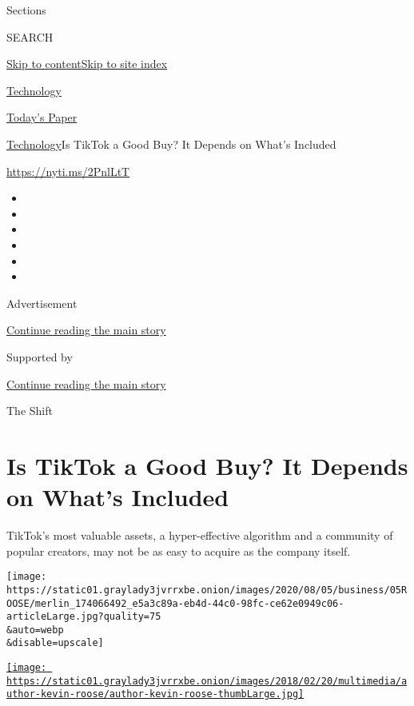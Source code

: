 Sections

SEARCH

\protect\hyperlink{site-content}{Skip to
content}\protect\hyperlink{site-index}{Skip to site index}

\href{https://www.nytimes3xbfgragh.onion/section/technology}{Technology}

\href{https://myaccount.nytimes3xbfgragh.onion/auth/login?response_type=cookie\&client_id=vi}{}

\href{https://www.nytimes3xbfgragh.onion/section/todayspaper}{Today's
Paper}

\href{/section/technology}{Technology}\textbar{}Is TikTok a Good Buy? It
Depends on What's Included

\url{https://nyti.ms/2PnlLtT}

\begin{itemize}
\item
\item
\item
\item
\item
\item
\end{itemize}

Advertisement

\protect\hyperlink{after-top}{Continue reading the main story}

Supported by

\protect\hyperlink{after-sponsor}{Continue reading the main story}

The Shift

\hypertarget{is-tiktok-a-good-buy-it-depends-on-whats-included}{%
\section{Is TikTok a Good Buy? It Depends on What's
Included}\label{is-tiktok-a-good-buy-it-depends-on-whats-included}}

TikTok's most valuable assets, a hyper-effective algorithm and a
community of popular creators, may not be as easy to acquire as the
company itself.

\texttt{[image: https://static01.graylady3jvrrxbe.onion/images/2020/08/05/business/05ROOSE/merlin\_174066492\_e5a3c89a-eb4d-44c0-98fc-ce62e0949c06-articleLarge.jpg?quality=75\\\&auto=webp\\\&disable=upscale]}

\href{https://www.nytimes3xbfgragh.onion/by/kevin-roose}{\texttt{[image: https://static01.graylady3jvrrxbe.onion/images/2018/02/20/multimedia/author-kevin-roose/author-kevin-roose-thumbLarge.jpg]}}

